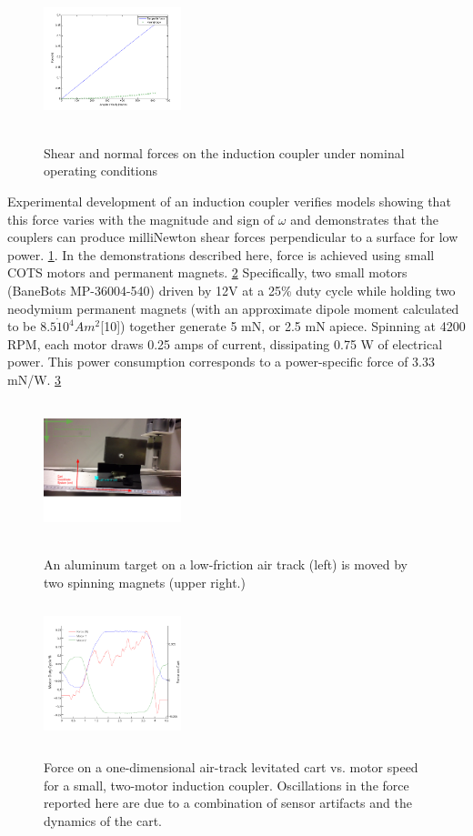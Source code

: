 \begin{figure}
\includegraphics[width = 4cm, height = 4cm ]{figures/tan_v_norm_force.png}
\label{fig:tan_v_norm_f}
\caption{Shear and normal forces on the induction coupler under nominal operating conditions}
\end{figure}

Experimental development of an induction coupler verifies models showing that this force varies with the magnitude and sign of $\omega$ and demonstrates that the couplers can produce milliNewton shear forces perpendicular to a surface for low power. \ref{fig:tan_v_norm_f}. In the demonstrations described here, force is achieved using small COTS motors and permanent magnets. \ref{fig:cart_picture} Specifically, two small motors (BaneBots MP-36004-540) driven by 12V at a 25\% duty cycle while holding two neodymium permanent magnets (with an approximate dipole moment calculated to be $8.5\dot10^4 Am^2$[10]) together generate 5 mN, or 2.5 mN apiece. Spinning at 4200 RPM, each motor draws 0.25 amps of current, dissipating 0.75 W of electrical power. This power consumption corresponds to a power-specific force of 3.33 mN/W. \ref{fig:force_plot}

\begin{figure}
\includegraphics[width = 4cm, height = 4cm ]{figures/cart_on_track.png}
\label{fig:cart_picture}
\caption{An aluminum target on a low-friction air track (left) is moved by two spinning magnets (upper right.)}
\end{figure}


\begin{figure}
\includegraphics[width = 4cm, height = 4cm ]{figures/motor_force_speed_plot.png}
\label{fig:force_plot}
\caption{Force on a one-dimensional air-track levitated cart vs. motor speed for a small, two-motor induction coupler. Oscillations in the force reported here are due to a combination of sensor artifacts and the dynamics of the cart.}
\end{figure}

